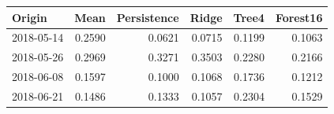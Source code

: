 \begin{tabular}{lrrrrr}\toprule
Origin & Mean & Persistence & Ridge & Tree4 & Forest16\\\midrule
2018-05-14 & 0.2590 & 0.0621 & 0.0715 & 0.1199 & 0.1063\\
2018-05-26 & 0.2969 & 0.3271 & 0.3503 & 0.2280 & 0.2166\\
2018-06-08 & 0.1597 & 0.1000 & 0.1068 & 0.1736 & 0.1212\\
2018-06-21 & 0.1486 & 0.1333 & 0.1057 & 0.2304 & 0.1529\\
\bottomrule\end{tabular}
